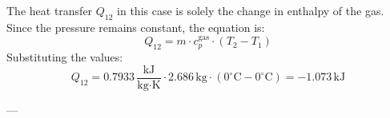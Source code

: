 The heat transfer \( Q_{12} \) in this case is solely the change in enthalpy of the gas. Since the pressure remains constant, the equation is:  
\[
Q_{12} = m \cdot c_p^{\text{gas}} \cdot (T_2 - T_1)
\]  
Substituting the values:  
\[
Q_{12} = 0.7933 \, \frac{\text{kJ}}{\text{kg·K}} \cdot 2.686 \, \text{kg} \cdot (0^\circ\text{C} - 0^\circ\text{C}) = -1.073 \, \text{kJ}
\]  

---